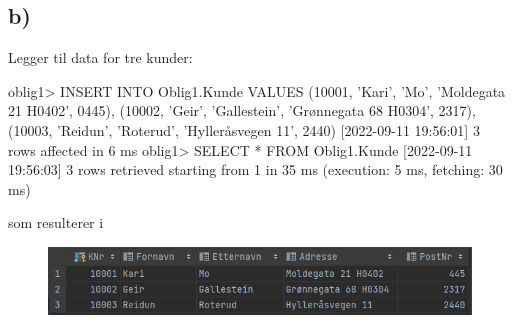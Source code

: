 \documentclass[%
notitlepage,
 amsmath,amssymb,
 aps,
rmp,
]{revtex4-2}  %
\begin{document}
\subsection*{b)}
Legger til data for tre kunder:
\begin{sql}
oblig1> INSERT INTO Oblig1.Kunde
        VALUES (10001, 'Kari', 'Mo', 'Moldegata 21 H0402', 0445),
               (10002, 'Geir', 'Gallestein', 'Grønnegata 68 H0304', 2317),
               (10003, 'Reidun', 'Roterud', 'Hylleråsvegen 11', 2440)
[2022-09-11 19:56:01] 3 rows affected in 6 ms
oblig1> SELECT *
        FROM Oblig1.Kunde
[2022-09-11 19:56:03] 3 rows retrieved starting from 1 in 35 ms (execution: 5 ms, fetching: 30 ms)
\end{sql}
som resulterer i
\begin{figure}[H]
\centering\includegraphics[width=\columnwidth]{op2b.png}
\end{figure}
\end{document}
